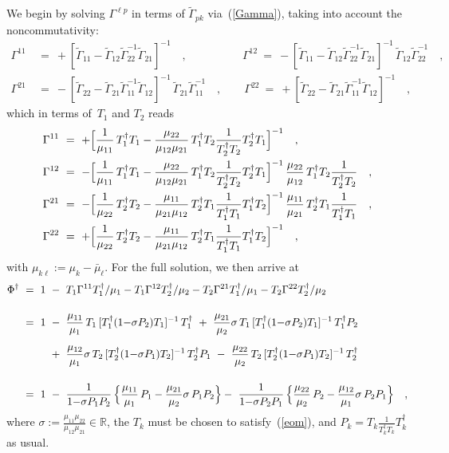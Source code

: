 \documentclass[a4paper,11pt]{article}
\numberwithin{equation}{section}
\def\s{\sigma}
\newcommand{\R}{\mathbb R}
\newcommand{\Tdag}{T^{\dagger}}
\newcommand{\Gt}{\widetilde{\Gamma}}
\begin{document}
We begin by solving $\Gamma^{\ell p}$ in terms of $\Gt_{pk}$
via~(\ref{Gamma}), taking into account the noncommutativity:
\begin{align}
\Gamma^{11}\ &=\ +[ \Gt_{11} - \Gt_{12}\Gt_{22}^{-1}\Gt_{21} ]^{-1}
                  \quad,\qquad \phantom{\Gt_{12}\Gt_{22}^{-1}}
\Gamma^{12}\  =\ -[ \Gt_{11} - \Gt_{12}\Gt_{22}^{-1}\Gt_{21} ]^{-1}\,
                  \Gt_{12}\Gt_{22}^{-1} \quad, \nonumber \\
\Gamma^{21}\ &=\ -[ \Gt_{22} - \Gt_{21}\Gt_{11}^{-1}\Gt_{12} ]^{-1}\,
                  \Gt_{21}\Gt_{11}^{-1} \quad,\qquad
\Gamma^{22}\  =\ +[ \Gt_{22} - \Gt_{21}\Gt_{11}^{-1}\Gt_{12} ]^{-1} \quad,
\end{align}
which in terms of~$T_1$ and $T_2$ reads
\begin{align}
\Gamma^{11}\ &=\
+\Bigl[ \frac{1}{\mu_{11}} \,\Tdag_1 T_1 - \frac{\mu_{22}}{\mu_{12}\mu_{21}}\,
\Tdag_1 T_2 \frac{1}{\Tdag_2 T_2} \Tdag_2 T_1 \Bigr]^{-1} \quad,\nonumber\\
\Gamma^{12}\ &=\
-\Bigl[ \frac{1}{\mu_{11}} \,\Tdag_1 T_1 - \frac{\mu_{22}}{\mu_{12}\mu_{21}}\,
\Tdag_1 T_2 \frac{1}{\Tdag_2 T_2} \Tdag_2 T_1 \Bigr]^{-1}\,
\frac{\mu_{22}}{\mu_{12}} \,\Tdag_1 T_2 \frac{1}{\Tdag_2 T_2} \quad,\nonumber\\
\Gamma^{21}\ &=\
-\Bigl[ \frac{1}{\mu_{22}} \,\Tdag_2 T_2 - \frac{\mu_{11}}{\mu_{21}\mu_{12}}\,
\Tdag_2 T_1 \frac{1}{\Tdag_1 T_1} \Tdag_1 T_2 \Bigr]^{-1}\,
\frac{\mu_{11}}{\mu_{21}} \,\Tdag_2 T_1 \frac{1}{\Tdag_1 T_1} \quad,\nonumber\\
\Gamma^{22}\ &=\
+\Bigl[ \frac{1}{\mu_{22}} \,\Tdag_2 T_2 - \frac{\mu_{11}}{\mu_{21}\mu_{12}}\,
\Tdag_2 T_1 \frac{1}{\Tdag_1 T_1} \Tdag_1 T_2 \Bigr]^{-1} \quad,
\label{Gammasol}
\end{align}
with $\mu_{k\ell}:=\mu_k{-}\bar{\mu}_\ell$.
For the full solution, we then arrive at
\begin{align}
\Phi^\dagger\ =\ 1\ &-\
T_1 \Gamma^{11} \Tdag_1/\mu_1 - T_1 \Gamma^{12} \Tdag_2/\mu_2 -
T_2 \Gamma^{21} \Tdag_1/\mu_1 - T_2 \Gamma^{22} \Tdag_2/\mu_2 \nonumber\\[12pt]
=\ 1\
&-\ \frac{\mu_{11}}{\mu_1}\,T_1\,[\Tdag_1(1{-}\s P_2)T_1]^{-1}\,\Tdag_1\
 +\ \frac{\mu_{21}}{\mu_2}\s\,T_1\,[\Tdag_1(1{-}\s P_2)T_1]^{-1}\,\Tdag_1 P_2\
\nonumber\\[6pt]
&+\ \frac{\mu_{12}}{\mu_1}\s\,T_2\,[\Tdag_2(1{-}\s P_1)T_2]^{-1}\,\Tdag_2 P_1\
 -\ \frac{\mu_{22}}{\mu_2}\,T_2\,[\Tdag_2(1{-}\s P_1)T_2]^{-1}\,\Tdag_2
\label{twosolT} \\[12pt]
=\ 1\
&-\ \frac{1}{1{-}\s P_1 P_2}\,\Bigl\{
\frac{\mu_{11}}{\mu_1}\,P_1 - \frac{\mu_{21}}{\mu_2}\s\,P_1 P_2 \Bigr\}
 -\ \frac{1}{1{-}\s P_2 P_1}\,\Bigl\{
\frac{\mu_{22}}{\mu_2}\,P_2 - \frac{\mu_{12}}{\mu_1}\s\,P_2 P_1 \Bigr\}
\quad,
\label{twosolP}
\end{align}
where $\s:=\frac{\mu_{11}\mu_{22}}{\mu_{12}\mu_{21}}\in\R$,
the $T_k$ must be chosen to satisfy~(\ref{eom}),
and $P_k=T_k\frac{1}{\Tdag_k T_k}\Tdag_k$ as usual.
\end{document}
